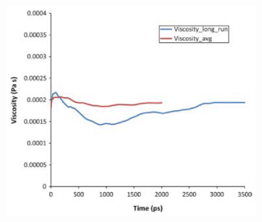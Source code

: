 \documentclass[9pt]{livecoms}
\begin{document}
\begin{figure}[htb!]
	\centering
	\includegraphics[width=3.2in]{figures/PayalFig2.png}
	\caption{}
	\label{fig:PayalFig2}
\end{figure}
\end{document}
